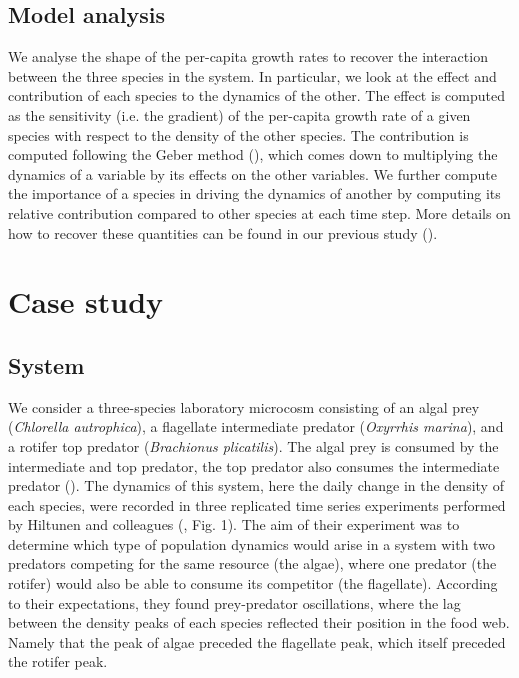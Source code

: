 \documentclass[11pt, oneside]{article}
\begin{document}
\subsection{Model analysis}

We analyse the shape of the per-capita growth rates to recover the interaction between the three species in the system.
In particular, we look at the effect and contribution of each species to the dynamics of the other.
The effect is computed as the sensitivity (i.e. the gradient) of the per-capita growth rate of a given species with respect to the density of the other species.
The contribution is computed following the Geber method (\cite{Hairston2005}), which comes down to multiplying the dynamics of a variable by its effects on the other variables.
We further compute the importance of a species in driving the dynamics of another by computing its relative contribution compared to other species at each time step.
More details on how to recover these quantities can be found in our previous study (\cite{Bonnaffe2021a}).

\section{Case study}

\subsection{System}

We consider a three-species laboratory microcosm consisting of an algal prey (\textit{Chlorella autrophica}), a flagellate intermediate predator (\textit{Oxyrrhis marina}), and a rotifer top predator (\textit{Brachionus plicatilis}).
The algal prey is consumed by the intermediate and top predator, the top predator also consumes the intermediate predator (\cite{Arndt1993}).
The dynamics of this system, here the daily change in the density of each species, were recorded in three replicated time series experiments performed by Hiltunen and colleagues (\cite{Hiltunen2013}, Fig. 1).
The aim of their experiment was to determine which type of population dynamics would arise in a system with two predators competing for the same resource (the algae), where one predator (the rotifer) would also be able to consume its competitor (the flagellate).
According to their expectations, they found prey-predator oscillations, where the lag between the density peaks of each species reflected their position in the food web.
Namely that the peak of algae preceded the flagellate peak, which itself preceded the rotifer peak.
\end{document}
